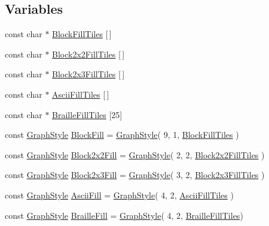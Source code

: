 \subsection*{Variables}
\begin{DoxyCompactItemize}
\item 
const char $\ast$ \hyperlink{namespaceutil_a52616f9bfe6a1b55be4fbf59c86a395d}{Block\-Fill\-Tiles} \mbox{[}$\,$\mbox{]}
\item 
const char $\ast$ \hyperlink{namespaceutil_ace53fa0f67b73a009ecfcd213f2a9c4b}{Block2x2\-Fill\-Tiles} \mbox{[}$\,$\mbox{]}
\item 
const char $\ast$ \hyperlink{namespaceutil_a1d4b23eb34b2077834e0f7c515fef3bd}{Block2x3\-Fill\-Tiles} \mbox{[}$\,$\mbox{]}
\item 
const char $\ast$ \hyperlink{namespaceutil_a6edaa0c0f58d9a71357073fc369fad34}{Ascii\-Fill\-Tiles} \mbox{[}$\,$\mbox{]}
\item 
const char $\ast$ \hyperlink{namespaceutil_a8ad9251402b8a8b1b274962be11450cb}{Braille\-Fill\-Tiles} \mbox{[}25\mbox{]}
\item 
const \hyperlink{structutil_1_1GraphStyle}{Graph\-Style} \hyperlink{namespaceutil_a45e2bfe1f081d82eb1c8b85d1fdf52a5}{Block\-Fill} = \hyperlink{structutil_1_1GraphStyle}{Graph\-Style}( 9, 1, \hyperlink{namespaceutil_a52616f9bfe6a1b55be4fbf59c86a395d}{Block\-Fill\-Tiles} )
\item 
const \hyperlink{structutil_1_1GraphStyle}{Graph\-Style} \hyperlink{namespaceutil_a3a125586d2b2e5ca5919c53072ecc405}{Block2x2\-Fill} = \hyperlink{structutil_1_1GraphStyle}{Graph\-Style}( 2, 2, \hyperlink{namespaceutil_ace53fa0f67b73a009ecfcd213f2a9c4b}{Block2x2\-Fill\-Tiles} )
\item 
const \hyperlink{structutil_1_1GraphStyle}{Graph\-Style} \hyperlink{namespaceutil_a9871fe0a0bcec6ff6079b0cfb42e83c2}{Block2x3\-Fill} = \hyperlink{structutil_1_1GraphStyle}{Graph\-Style}( 3, 2, \hyperlink{namespaceutil_a1d4b23eb34b2077834e0f7c515fef3bd}{Block2x3\-Fill\-Tiles} )
\item 
const \hyperlink{structutil_1_1GraphStyle}{Graph\-Style} \hyperlink{namespaceutil_aa7ca871ee211dfcc0cd14dd61f319828}{Ascii\-Fill} = \hyperlink{structutil_1_1GraphStyle}{Graph\-Style}( 4, 2, \hyperlink{namespaceutil_a6edaa0c0f58d9a71357073fc369fad34}{Ascii\-Fill\-Tiles} )
\item 
const \hyperlink{structutil_1_1GraphStyle}{Graph\-Style} \hyperlink{namespaceutil_a0e903f9947d8a325181915b32e977e4c}{Braille\-Fill} = \hyperlink{structutil_1_1GraphStyle}{Graph\-Style}( 4, 2, \hyperlink{namespaceutil_a8ad9251402b8a8b1b274962be11450cb}{Braille\-Fill\-Tiles})
\end{DoxyCompactItemize}


